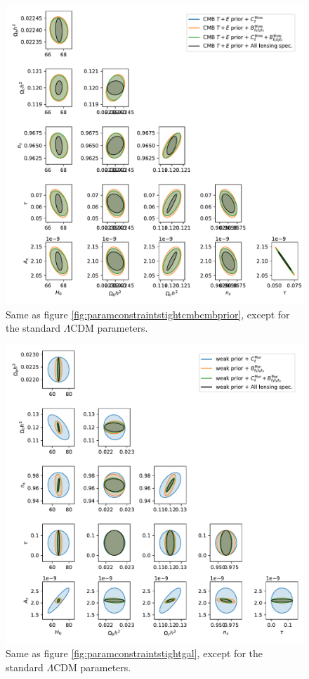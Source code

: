 \documentclass[11pt]{article} %
\begin{document}
\begin{figure}[h!]
    \centering
    \includegraphics[width=\textwidth]{paper/figures/param_constraints_lcdm_cmb_cmb_prior.pdf}
    \caption{Same as figure \ref{fig:paramconstraintstightcmbcmbprior}, except for the standard $\Lambda$CDM parameters.}
    \label{fig:paramconstraintsallcmbcmbprior}
\end{figure}

\begin{figure}[h!]
    \centering
    \includegraphics[width=\textwidth]{paper/figures/param_constraints_lcdm_gal_weak_prior.pdf}
    \caption{Same as figure \ref{fig:paramconstraintstightgal}, except for the standard $\Lambda$CDM parameters.}
    \label{fig:paramconstraintsallgal}
\end{figure}
\end{document}
